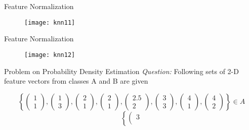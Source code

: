 \begin{frame}{Feature Normalization}
\begin{figure}
\texttt{[image: knn11]}
\end{figure}
\end{frame}

\begin{frame}{Feature Normalization}
\begin{figure}
\texttt{[image: knn12]}
\end{figure}
\end{frame}

\begin{frame}{Problem on Probability Density Estimation}
\textit{Question:} Following sets of 2-D feature vectors from classes A and B are given
\begin{footnotesize}
\begin{equation}
\left\{ {\left( {\begin{array}{*{20}{c}}
1\\
1
\end{array}} \right),\left( {\begin{array}{*{20}{c}}
1\\
3
\end{array}} \right),\left( {\begin{array}{*{20}{c}}
2\\
1
\end{array}} \right),\left( {\begin{array}{*{20}{c}}
2\\
1
\end{array}} \right),\left( {\begin{array}{*{20}{c}}
{2.5}\\
2
\end{array}} \right),\left( {\begin{array}{*{20}{c}}
3\\
3
\end{array}} \right),\left( {\begin{array}{*{20}{c}}
4\\
1
\end{array}} \right),\left( {\begin{array}{*{20}{c}}
4\\
2
\end{array}} \right)} \right\} \in A \nonumber
\end{equation}
\begin{equation}
\left\{ {\left( {\begin{array}{*{20}{c}}
3\\

\end{array}}}
\end{equation}
\end{footnotesize}
\end{frame}

